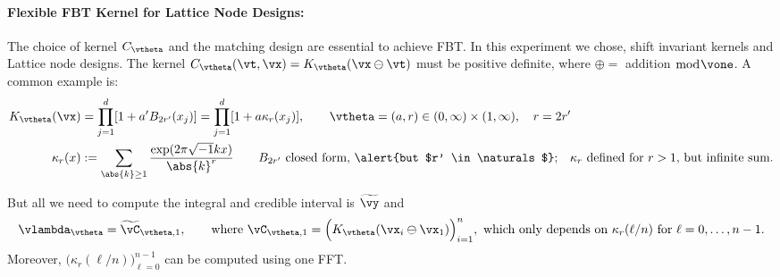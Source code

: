 \paragraph{Flexible FBT Kernel for Lattice Node Designs:}
The choice of kernel $C_\vtheta$ and the matching design are essential to achieve FBT. In this experiment we chose, shift invariant kernels and Lattice node designs. The kernel $C_\vtheta(\vt,\vx) = K_\vtheta(\vx \ominus \vt)$ must be \alert{positive definite}, where
$\oplus = $ addition $\bmod \vone$. A common example is: 
\begin{align*}
K_\vtheta(\vx) & = \prod_{j=1}^d [1 + a' B_{2r'}(x_j)] = \prod_{j=1}^d [1 + a \kappa_r(x_j)], \qquad
\vtheta = (a,r) \in (0,\infty) \times (1,\infty), \quad r = 2r'\\
\kappa_r(x) &   : = \sum_{\abs{k} \ge 1}\frac{\exp(2\pi\sqrt{-1} kx)}{\abs{k}^{r}} \qquad
   \text{$B_{2r'}$ closed form, \alert{but $r' \in \naturals$};\quad $\kappa_r$ defined for  $r>1$, {but infinite sum}}.
\end{align*}

But all we need to compute the integral and credible interval is $\widetilde{\vy}$ and 
	\[
	\vlambda_\vtheta =  \widetilde{\vC}_{\vtheta,1}, \qquad \text{where } \vC_{\vtheta,1} = \Bigl(  K_{\vtheta}(\vx_i \ominus \vx_1)\Bigr)_{i=1}^n,  \text{ which only depends on } \kappa_r(\ell/n) \text{ for } \ell = 0, \ldots, n-1 .
	\]
Moreover, $\bigl( \kappa_r(\ell/n) \bigr)_{\ell = 0}^{n-1}$ can be computed using one FFT. 